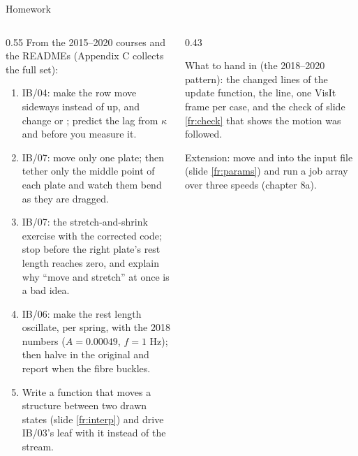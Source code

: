 \documentclass[aspectratio=169,11pt]{beamer}
\begin{document}
\begin{frame}{Homework}
\label{fr:hw}
\begin{columns}[T,onlytextwidth]
\begin{column}{0.55\textwidth}
\scriptsize From the 2015--2020 courses and the READMEs (Appendix C collects the full set):
\begin{enumerate}
  \item IB/04: make the row move sideways instead of up, and change  or ; predict the lag from $\kappa$ and  before you measure it.
  \item IB/07: move only one plate; then tether only the middle point of each plate and watch them bend as they are dragged.
  \item IB/07: the stretch-and-shrink exercise with the corrected code; stop before the right plate's rest length reaches zero, and explain why ``move and stretch'' at once is a bad idea.
  \item IB/06: make the rest length oscillate,  per spring, with the 2018 numbers ($A = 0.00049$, $f = 1$ Hz); then halve  in the original and report when the fibre buckles.
  \item Write a function that moves a structure between two drawn states (slide \ref{fr:interp}) and drive IB/03's leaf with it instead of the stream.
\end{enumerate}
\end{column}
\begin{column}{0.43\textwidth}
\begin{punchbox}
\scriptsize What to hand in (the 2018--2020 pattern): the changed lines of the update function, the  line, one VisIt frame per case, and the check of slide \ref{fr:check} that shows the motion was followed.
\end{punchbox}
\scriptsize Extension: move  and  into the input file (slide \ref{fr:params}) and run a job array over three speeds (chapter 8a).
\end{column}
\end{columns}
\end{frame}
\end{document}
